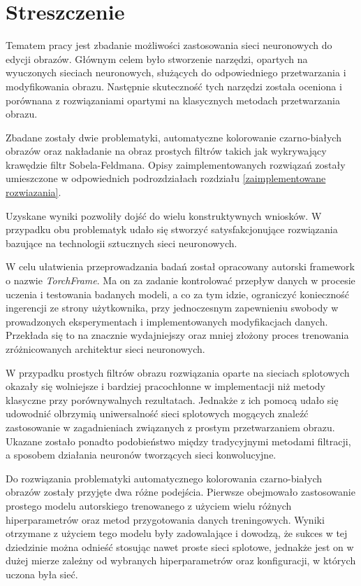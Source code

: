 \section*{Streszczenie}

  Tematem pracy jest zbadanie możliwości zastosowania sieci neuronowych do
  edycji obrazów. Głównym celem było stworzenie narzędzi, opartych na wyuczonych
  sieciach neuronowych, służących do odpowiedniego przetwarzania i
  modyfikowania obrazu. Następnie skuteczność tych narzędzi została oceniona i
  porównana z rozwiązaniami opartymi na klasycznych metodach przetwarzania obrazu.

  Zbadane zostały dwie problematyki, automatyczne kolorowanie czarno-białych obrazów
  oraz nakładanie na obraz prostych filtrów takich jak wykrywający
  krawędzie filtr Sobela-Feldmana. Opisy zaimplementowanych rozwiązań zostały
  umieszczone w odpowiednich podrozdziałach
  rozdziału \ref{zaimplementowane rozwiazania}.

  Uzyskane wyniki pozwoliły dojść do wielu konstruktywnych wniosków. W przypadku obu
  problematyk udało się stworzyć satysfakcjonujące rozwiązania bazujące na
  technologii sztucznych sieci neuronowych.

  W celu ułatwienia przeprowadzania badań został opracowany autorski framework
  o nazwie \textit{TorchFrame}. Ma on za zadanie kontrolować
  przepływ danych w procesie uczenia i testowania badanych modeli, a co za tym
  idzie, ograniczyć konieczność ingerencji ze strony użytkownika, przy jednoczesnym
  zapewnieniu swobody w prowadzonych eksperymentach i implementowanych modyfikacjach danych. Przekłada
  się to na znacznie wydajniejszy oraz mniej złożony proces trenowania
  zróżnicowanych architektur sieci neuronowych.

  W przypadku prostych filtrów obrazu rozwiązania
  oparte na sieciach splotowych okazały się wolniejsze i bardziej pracochłonne w
  implementacji niż metody klasyczne przy porównywalnych rezultatach. Jednakże
  z ich pomocą udało się udowodnić olbrzymią uniwersalność sieci splotowych
  mogących znaleźć zastosowanie w zagadnieniach związanych z prostym
  przetwarzaniem obrazu. Ukazane zostało ponadto podobieństwo między tradycyjnymi
  metodami filtracji, a sposobem działania neuronów tworzących sieci konwolucyjne.

  Do rozwiązania problematyki automatycznego kolorowania czarno-białych
  obrazów zostały przyjęte dwa różne podejścia. Pierwsze obejmowało
  zastosowanie prostego modelu autorskiego trenowanego z użyciem wielu różnych
  hiperparametrów oraz metod przygotowania danych treningowych.
  Wyniki otrzymane z użyciem tego modelu były zadowalające i dowodzą, że
  sukces w tej dziedzinie można odnieść stosując nawet proste sieci splotowe,
  jednakże jest on w dużej mierze zależny od wybranych hiperparametrów oraz
  konfiguracji, w których uczona była sieć.

